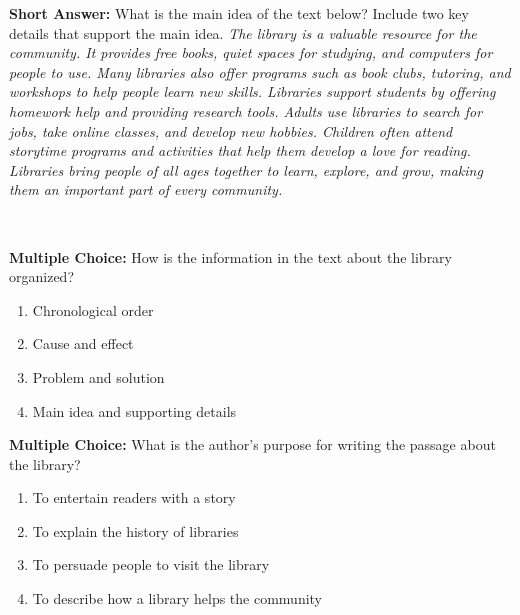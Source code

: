 \documentclass[12pt]{article}
\begin{document}
\begin{tcolorbox}[colframe=black!50, colback=white, title=Question 6]
\textbf{Short Answer:} What is the main idea of the text below? Include two key details that support the main idea.  
\textit{The library is a valuable resource for the community. It provides free books, quiet spaces for studying, and computers for people to use. Many libraries also offer programs such as book clubs, tutoring, and workshops to help people learn new skills. Libraries support students by offering homework help and providing research tools. Adults use libraries to search for jobs, take online classes, and develop new hobbies. Children often attend storytime programs and activities that help them develop a love for reading. Libraries bring people of all ages together to learn, explore, and grow, making them an important part of every community.}

\vspace{2em}
\underline{\hspace{15.8cm}}  
    \\[0.8cm] \underline{\hspace{15.8cm}}  
\end{tcolorbox}

\begin{tcolorbox}[colframe=black!50, colback=white, title=Question 7]
\textbf{Multiple Choice:} How is the information in the text about the library organized?  
\begin{enumerate}[label=(\Alph*)]
\item Chronological order  
\item Cause and effect  
\item Problem and solution  
\item Main idea and supporting details  
\end{enumerate}
\end{tcolorbox}

\begin{tcolorbox}[colframe=black!50, colback=white, title=Question 8]
\textbf{Multiple Choice:} What is the author’s purpose for writing the passage about the library?  
\begin{enumerate}[label=(\Alph*)]
\item To entertain readers with a story  
\item To explain the history of libraries  
\item To persuade people to visit the library  
\item To describe how a library helps the community  
\end{enumerate}
\end{tcolorbox}
\end{document}
